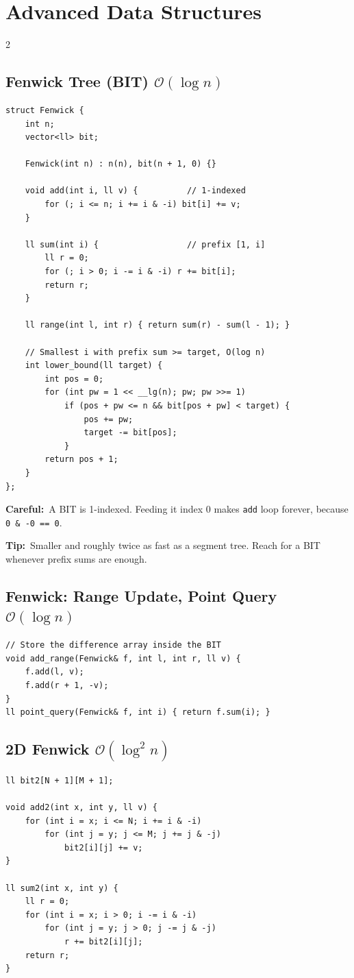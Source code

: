 \documentclass[10pt]{article}
\newcommand{\code}[1]{\texttt{\small #1}}
\newcommand{\sub}[2]{\subsection[#1]{#1\hspace{0.6em}%
  \textnormal{\color{accent2}\small$\mathcal{O}(#2)$}}}
\newcommand{\tip}[1]{{\color{tipc}\footnotesize\textbf{Tip:}}~{\footnotesize #1}\par}
\newcommand{\warn}[1]{{\color{warnc}\footnotesize\textbf{Careful:}}~{\footnotesize #1}\par}
\begin{document}
\section{Advanced Data Structures}
\begin{multicols}{2}

\sub{Fenwick Tree (BIT)}{\log n}
\begin{lstlisting}
struct Fenwick {
    int n;
    vector<ll> bit;

    Fenwick(int n) : n(n), bit(n + 1, 0) {}

    void add(int i, ll v) {          // 1-indexed
        for (; i <= n; i += i & -i) bit[i] += v;
    }

    ll sum(int i) {                  // prefix [1, i]
        ll r = 0;
        for (; i > 0; i -= i & -i) r += bit[i];
        return r;
    }

    ll range(int l, int r) { return sum(r) - sum(l - 1); }

    // Smallest i with prefix sum >= target, O(log n)
    int lower_bound(ll target) {
        int pos = 0;
        for (int pw = 1 << __lg(n); pw; pw >>= 1)
            if (pos + pw <= n && bit[pos + pw] < target) {
                pos += pw;
                target -= bit[pos];
            }
        return pos + 1;
    }
};
\end{lstlisting}
\warn{A BIT is 1-indexed. Feeding it index 0 makes \code{add} loop
forever, because \code{0 \& -0 == 0}.}
\tip{Smaller and roughly twice as fast as a segment tree. Reach for a
BIT whenever prefix sums are enough.}

\sub{Fenwick: Range Update, Point Query}{\log n}
\begin{lstlisting}
// Store the difference array inside the BIT
void add_range(Fenwick& f, int l, int r, ll v) {
    f.add(l, v);
    f.add(r + 1, -v);
}
ll point_query(Fenwick& f, int i) { return f.sum(i); }
\end{lstlisting}

\sub{2D Fenwick}{\log^2 n}
\begin{lstlisting}
ll bit2[N + 1][M + 1];

void add2(int x, int y, ll v) {
    for (int i = x; i <= N; i += i & -i)
        for (int j = y; j <= M; j += j & -j)
            bit2[i][j] += v;
}

ll sum2(int x, int y) {
    ll r = 0;
    for (int i = x; i > 0; i -= i & -i)
        for (int j = y; j > 0; j -= j & -j)
            r += bit2[i][j];
    return r;
}


\end{lstlisting}
\end{multicols}
\end{document}
